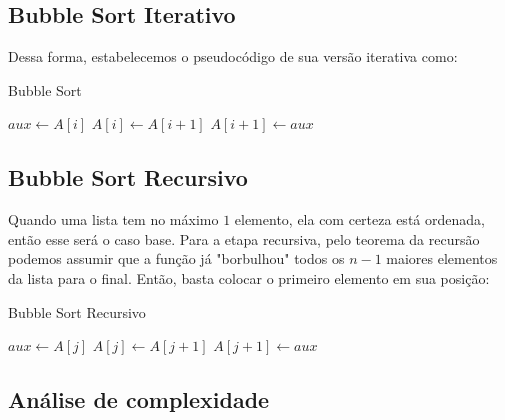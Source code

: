 \subsection{Bubble Sort Iterativo}

Dessa forma, estabelecemos o pseudocódigo de sua versão iterativa como:

\begin{algorithm}
	\caption{Bubble Sort}
	\label{algo:bubble_sort_it}
	\begin{algorithmic}[1]
		\Statex
		\State $aux \gets A[i]$
		\State $A[i] \gets A[i + 1]$
		\State $A[i + 1] \gets aux$
		\EndIf
		\EndFor
		\EndFor
		\EndFunction
	\end{algorithmic}
\end{algorithm}
\FloatBarrier

\subsection{Bubble Sort Recursivo}

Quando uma lista tem no máximo $1$ elemento, ela com certeza está ordenada, então esse será o caso base. Para a etapa recursiva, pelo teorema da recursão podemos assumir que a função já "borbulhou" todos os $n - 1$ maiores elementos da lista para o final. Então, basta colocar o primeiro elemento em sua posição:

\begin{algorithm}
	\caption{Bubble Sort Recursivo}
	\label{algo:bubble_sort_recursivo}
	\begin{algorithmic}[1]
		\Statex
		\Return{}
		\EndIf
		\State $aux \gets A[j]$
		\State $A[j] \gets A[j + 1]$
		\State $A[j + 1] \gets aux$
		\EndIf
		\EndFor
		\State {}
		\EndFunction
	\end{algorithmic}
\end{algorithm}
\FloatBarrier

\subsection{Análise de complexidade}

